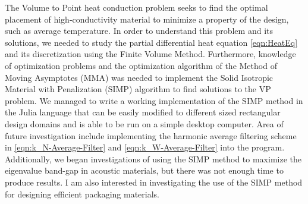 The Volume to Point heat conduction problem seeks to find the optimal placement of high-conductivity material to minimize a property of the design, such as average temperature. In order to understand this problem and its solutions, we needed to study the partial differential heat equation \eqref{eqn:HeatEq} and its discretization using the Finite Volume Method. Furthermore, knowledge of optimization problems and the optimization algorithm of the Method of Moving Asymptotes (MMA) was needed to implement the Solid Isotropic Material with Penalization (SIMP) algorithm to find solutions to the VP problem.
We managed to write a working implementation of the SIMP method in the Julia language that can be easily modified to different sized rectangular design domains and is able to be run on a simple desktop computer.
Area of future investigation include implementing the harmonic average filtering scheme in \eqref{eqn:k_N-Average-Filter} and \eqref{eqn:k_W-Average-Filter} into the program. Additionally, we began investigations of using the SIMP method to maximize the eigenvalue band-gap in acoustic materials, but there was not enough time to produce results. I am also interested in investigating the use of the SIMP method for designing efficient packaging materials.